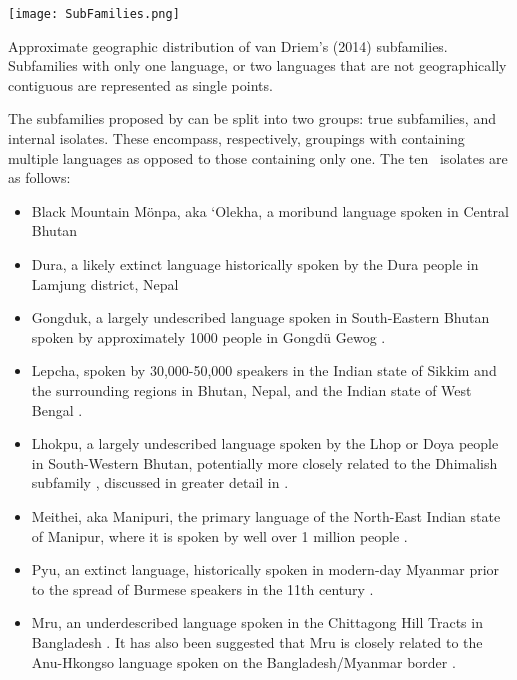 \begin{map}

\centering
\texttt{[image: SubFamilies.png]}
\caption{Approximate geographic distribution of van Driem's (2014) subfamilies. Subfamilies with only one language, or two languages that are not geographically contiguous are represented as single points.}
\label{fig:SubFamMap}
\end{map}

The subfamilies proposed by  can be split into two groups: true subfamilies, and internal isolates. These encompass, respectively, groupings with containing multiple languages as opposed to those containing only one. The ten \lfam\ isolates are as follows:


\begin{itemize}
    \item Black Mountain Mönpa, aka `Olekha, a moribund language spoken in Central Bhutan \cites{vanDriem1995}{Hyslop2016}
    \item Dura, a likely extinct language historically spoken by the Dura people in Lamjung district, Nepal \cite{Schorer2016}
    \item Gongduk, a largely undescribed language spoken in South-Eastern Bhutan spoken by approximately 1000 people in Gongdü Gewog \cite{Bodt2012}.
    \item Lepcha, spoken by 30,000-50,000 speakers in the Indian state of Sikkim and the surrounding regions in Bhutan, Nepal, and the Indian state of West Bengal \cite{Plaisier2007}.
    \item Lhokpu, a largely undescribed language spoken by the Lhop or Doya people in South-Western Bhutan, potentially more closely related to the Dhimalish subfamily \cites{Bodt2012}{Grollmann2018}, discussed in greater detail in .
    \item Meithei, aka Manipuri, the primary language of the North-East Indian state of Manipur, where it is spoken by well over 1 million people \cite{Chelliah1997}.
    \item Pyu, an extinct language, historically spoken in modern-day Myanmar prior to the spread of Burmese speakers in the 11th century \cite{Miyake2019}.
    \item Mru, an underdescribed language spoken in the Chittagong Hill Tracts in Bangladesh \cite{VanDriem2014}. It has also been suggested that Mru is closely related to the Anu-Hkongso language spoken on the Bangladesh/Myanmar border \cite{Peterson2017}.

\end{itemize}
